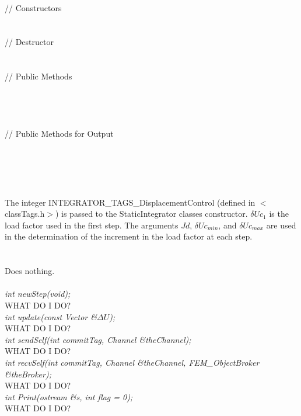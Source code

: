  \\
\indent // Constructors \\
\\ \\
\indent // Destructor \\
\\  \\
\indent // Public Methods \\
 \\
 \\
 \\ \\
\indent // Public Methods for Output\\
\\ 
\\ 
\\

 \\
\\ 
The integer INTEGRATOR\_TAGS\_DisplacementControl (defined in
$<$classTags.h$>$) is passed to the StaticIntegrator classes
constructor. $\delta Uc_1$ is the load factor used in the first
step. The arguments $Jd$, $\delta Uc_{min}$, and $\delta
Uc_{max}$ are used in the determination of the increment in the
load factor at each step. \\



 \\
\\ 
Does nothing. \\

\\

{\em int newStep(void);} \\
WHAT DO I DO?\\

{\em int update(const Vector \&$\Delta U$);} \\
WHAT DO I DO?\\

{\em int sendSelf(int commitTag, Channel \&theChannel); } \\ 
WHAT DO I DO?\\

{\em int recvSelf(int commitTag, Channel \&theChannel, 
FEM\_ObjectBroker \&theBroker); } \\ 
WHAT DO I DO?\\

{\em int Print(ostream \&s, int flag = 0);}\\
WHAT DO I DO?
